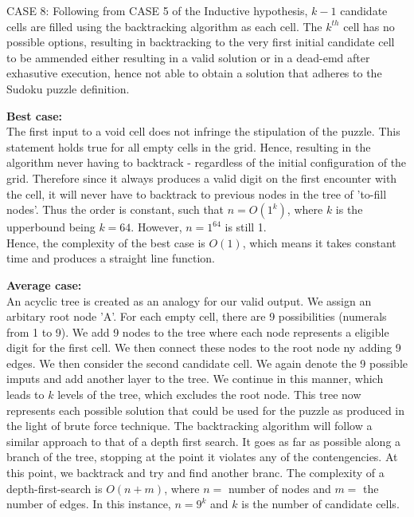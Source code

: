 \documentclass[12pt]{article}
\begin{document}
\begin{flushleft}
CASE 8: Following from CASE 5 of the Inductive hypothesis, $k-1$ candidate cells are filled using the backtracking algorithm as each cell. The $k^{th}$ cell has no possible options, resulting in backtracking to the very first initial candidate cell to be ammended either resulting in a valid solution or in a dead-emd after exhasutive execution, hence not able to obtain a solution that adheres to the Sudoku puzzle definition. 
\end{flushleft}
\begin{flushleft}
\textbf{Best case:}\\
The first input to a void cell does not infringe the stipulation of the puzzle. This statement holds true for all empty cells in the grid. Hence, resulting in the algorithm never having to backtrack - regardless of the initial configuration of the grid. Therefore since it always produces a valid digit on the first encounter with the cell, it will never have to backtrack to previous nodes in the tree of 'to-fill nodes'. Thus the order is constant, such that $n = O(1^k) $, where $k$ is the upperbound being $k = 64$. However, $n = 1^64$ is still 1. \\
Hence, the complexity of the best case is  $O(1)$, which means it takes constant time and produces a straight line function.
\end{flushleft}
\begin{flushleft}
\textbf{Average case:}\\
An acyclic tree is created as an analogy for our valid output. We assign an arbitary root node 'A'. For each empty cell, there are 9 possibilities (numerals from 1 to 9). We add 9 nodes to the tree where each node represents a eligible digit for the first cell. We then connect these nodes to the root node ny adding 9 edges. We then consider the second candidate cell. We again denote the 9 possible imputs and add another layer to the tree. We continue in this manner, which leads to $k$ levels of the tree, which excludes the root node. This tree now represents each possible solution that could be used for the puzzle as produced in the light of brute force technique. The backtracking algorithm will follow a  similar approach to that of a depth first search. It goes as far as possible along a branch of the tree, stopping at the point it violates any of the contengencies. At this point, we backtrack and try and find another branc. The complexity of a depth-first-search is $O(n+m)$, where $n = $ number of nodes and $m = $ the number of edges. In this instance, $n = 9^k$ and $k$ is the number of candidate cells.   
\end{flushleft}
\end{document}
